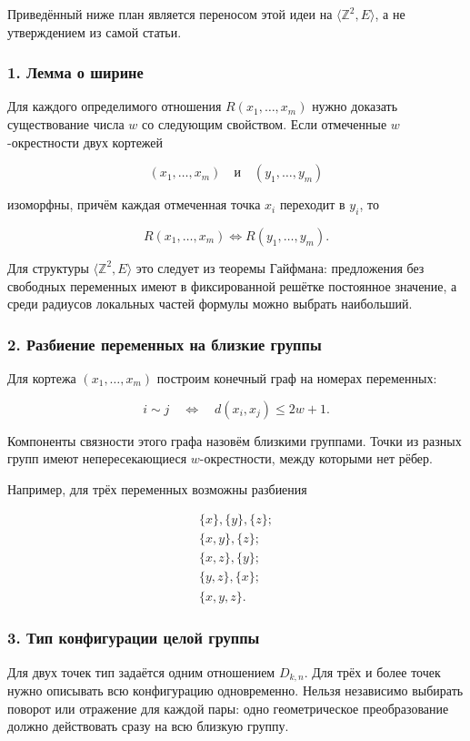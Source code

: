 Приведённый ниже план является переносом этой идеи на $\langle\mathbb Z^2,E\rangle$, а не
утверждением из самой статьи.

\subsubsection{1. Лемма о ширине}

Для каждого определимого отношения $R(x_1,\ldots,x_m)$ нужно доказать существование
числа $w$ со следующим свойством. Если отмеченные $w$-окрестности двух кортежей

$$(x_1,\ldots,x_m)\quad\text{и}\quad(y_1,\ldots,y_m)$$

изоморфны, причём каждая отмеченная точка $x_i$ переходит в $y_i$, то

$$R(x_1,\ldots,x_m)\Leftrightarrow R(y_1,\ldots,y_m).$$

Для структуры $\langle\mathbb Z^2,E\rangle$ это следует из теоремы Гайфмана: предложения без
свободных переменных имеют в фиксированной решётке постоянное значение, а среди
радиусов локальных частей формулы можно выбрать наибольший.

\subsubsection{2. Разбиение переменных на близкие группы}

Для кортежа $(x_1,\ldots,x_m)$ построим конечный граф на номерах переменных:

$$i\mathrel{\sim}j\quad\Leftrightarrow\quad d(x_i,x_j)\le2w+1.$$

Компоненты связности этого графа назовём близкими группами. Точки из разных
групп имеют непересекающиеся $w$-окрестности, между которыми нет рёбер.

Например, для трёх переменных возможны разбиения

$$
\begin{aligned}
\{x\}, \{y\}, \{z\};\\
\{x,y\}, \{z\};\\
\{x,z\}, \{y\};\\
\{y,z\}, \{x\};\\
\{x,y,z\}.
\end{aligned}
$$

\subsubsection{3. Тип конфигурации целой группы}

Для двух точек тип задаётся одним отношением $D_{k,n}$. Для трёх и более точек
нужно описывать всю конфигурацию одновременно. Нельзя независимо выбирать
поворот или отражение для каждой пары: одно геометрическое преобразование должно
действовать сразу на всю близкую группу.

